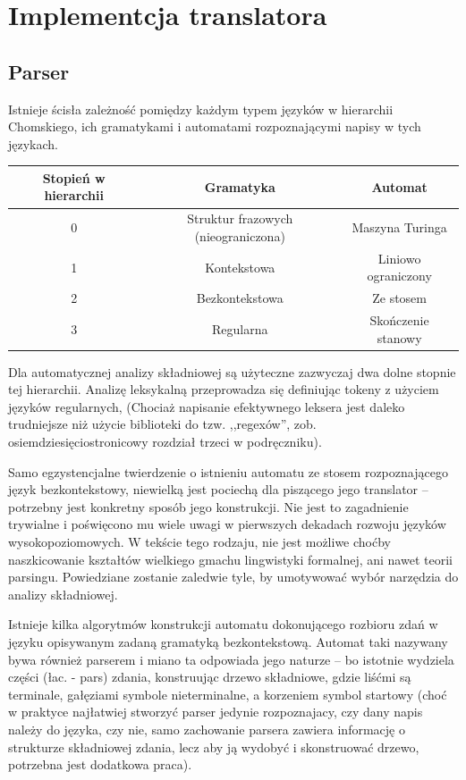 \chapter{Implementcja translatora}
\section{Parser}
Istnieje ścisła zależność pomiędzy każdym typem języków w hierarchii Chomskiego, ich gramatykami i automatami rozpoznającymi napisy w tych językach.\cite{CHOMSKY1959}\cite{hopcroft_automaty}
\begin{center}
\begin{tabular}{|c|c|c|}
\hline
\textbf{Stopień w hierarchii} & \textbf{Gramatyka} & \textbf{Automat} \\ \hline
0 & Struktur frazowych (nieograniczona) & Maszyna Turinga \\ \hline
1 & Kontekstowa & Liniowo ograniczony\\ \hline
2 & Bezkontekstowa & Ze stosem\\ \hline
3 & Regularna & Skończenie stanowy\\ \hline
\end{tabular}
\end{center}

Dla automatycznej analizy składniowej są użyteczne zazwyczaj dwa dolne stopnie tej hierarchii. Analizę leksykalną przeprowadza się definiując tokeny z użyciem języków regularnych, (Chociaż napisanie efektywnego leksera jest daleko trudniejsze niż użycie biblioteki do tzw. ,,regexów'', zob. osiemdziesięciostronicowy rozdział trzeci w podręczniku\cite{DRAGON_BOOK}).

Samo egzystencjalne twierdzenie o istnieniu automatu ze stosem rozpoznającego język bezkontekstowy, niewielką jest pociechą dla piszącego jego translator – potrzebny jest konkretny sposób jego konstrukcji. Nie jest to zagadnienie trywialne i poświęcono mu wiele uwagi w pierwszych dekadach rozwoju języków wysokopoziomowych. W tekście tego rodzaju, nie jest możliwe choćby naszkicowanie kształtów wielkiego gmachu lingwistyki formalnej, ani nawet teorii parsingu. Powiedziane zostanie zaledwie tyle, by umotywować wybór narzędzia do analizy składniowej.

Istnieje kilka algorytmów konstrukcji automatu dokonującego rozbioru zdań w języku opisywanym zadaną gramatyką bezkontekstową. Automat taki nazywany bywa również parserem i miano ta odpowiada jego naturze – bo istotnie wydziela części (łac. - pars) zdania, konstruując drzewo składniowe, gdzie liśćmi są terminale, gałęziami symbole nieterminalne, a korzeniem symbol startowy (choć w praktyce najłatwiej stworzyć parser jedynie rozpoznajacy, czy dany napis należy do języka, czy nie, samo zachowanie parsera zawiera informację o strukturze składniowej zdania, lecz aby ją wydobyć i skonstruować drzewo, potrzebna jest dodatkowa praca)\cite{DRAGON_BOOK}.

